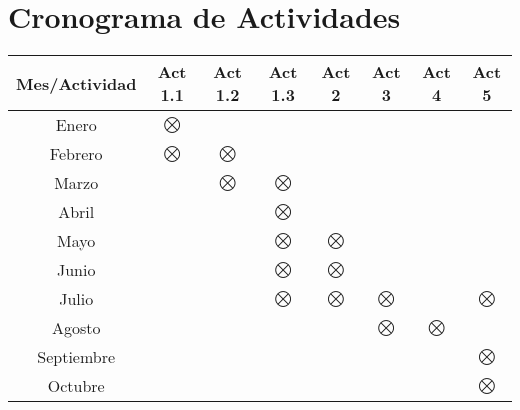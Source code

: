 \documentclass[11pt]{article}
\begin{document}


\section{Cronograma de Actividades}	


\begin{center}
{\small
\begin{tabular}{|c|c|c|c|c|c|c|c|}
\hline

\textbf{Mes}/\textbf{Actividad}&\textbf{Act 1.1}&\textbf{Act 1.2}
&\textbf{Act 1.3}&\textbf{Act 2}&\textbf{Act 3}&\textbf{Act 4}&\textbf{Act 5}\\

\hline

Enero&$\bigotimes$&&&&&&\\

\hline

Febrero&$\bigotimes$&$\bigotimes$&&&&&\\

\hline

Marzo&&$\bigotimes$&$\bigotimes$&&&&\\

\hline

Abril&&&$\bigotimes$&&&&\\

\hline

Mayo&&&$\bigotimes$&$\bigotimes$&&&\\

\hline

Junio&&&$\bigotimes$&$\bigotimes$&&&\\

\hline
Julio&&&$\bigotimes$&$\bigotimes$&$\bigotimes$&&$\bigotimes$\\

\hline

Agosto&&&&&$\bigotimes$&$\bigotimes$&\\

\hline 

Septiembre&&&&&&&$\bigotimes$\\

\hline
Octubre&&&&&&&$\bigotimes$\\
\hline

\end{tabular}
}
\end{center}



\medskip







\end{document}
